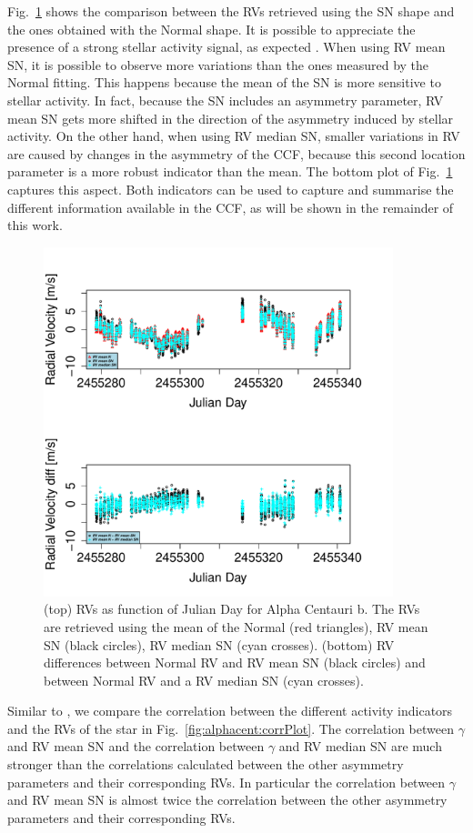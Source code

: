 \documentclass[11pt, oneside]{article}
\begin{document}
Fig.~\ref{fig:alphacent:diff:RV} shows the comparison between the RVs retrieved using the SN shape and the ones obtained with the Normal shape. It is possible to appreciate the presence of a strong stellar activity signal, as expected \citep{Dumusque-2012,Thompson-2017}. When using RV mean SN, it is possible to observe more variations than the ones measured by the Normal fitting. This happens because the mean of the SN is more sensitive to stellar activity. In fact, because the SN includes an asymmetry parameter, RV mean SN gets more shifted in the direction of the asymmetry induced by stellar activity. On the other hand, when using RV median SN, smaller variations in RV are caused by changes in the asymmetry of the CCF, because this second location parameter is a more robust indicator than the mean. The bottom plot of Fig.~\ref{fig:alphacent:diff:RV} captures this aspect. Both indicators can be used to capture and summarise the different information available in the CCF, as will be shown in the remainder of this work.
%
\begin{figure}[htbp]
   \centering
\includegraphics[height = 4in]{HD12862_[2]RadialVelocityDifferences.pdf} 
   \caption{(top) RVs as function of Julian Day for Alpha Centauri b. The RVs are retrieved using the mean of the Normal (red triangles), RV mean SN (black circles), RV median SN (cyan crosses). (bottom) RV differences between Normal RV and RV mean SN (black circles) and between Normal RV and a RV median SN (cyan crosses).}
   \label{fig:alphacent:diff:RV}
\end{figure}
%

Similar to \citet{Figueira-2013}, we compare the correlation between the different activity indicators and the RVs of the star in Fig.~\ref{fig:alphacent:corrPlot}. The correlation between $\gamma$ and RV mean SN and the correlation between $\gamma$ and RV median SN are much stronger than the correlations calculated between the other asymmetry parameters and their corresponding RVs. In particular the correlation between $\gamma$ and RV mean SN is almost twice the correlation between the other asymmetry parameters and their corresponding RVs.
\end{document}
